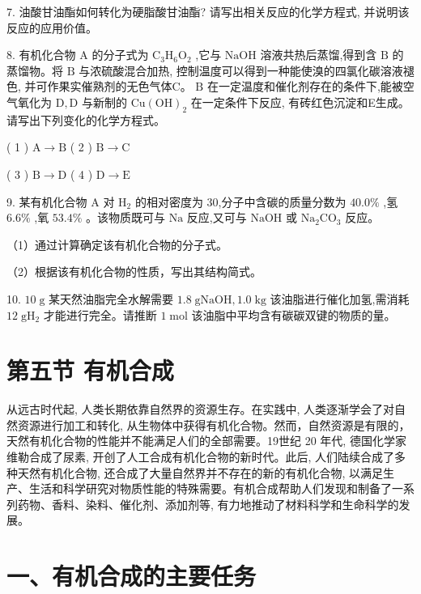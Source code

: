 \documentclass[10pt]{article}
\begin{document}
7. 油酸甘油酯如何转化为硬脂酸甘油酯? 请写出相关反应的化学方程式, 并说明该反应的应用价值。

8. 有机化合物 \(\mathrm{A}\) 的分子式为 \({\mathrm{C}}_{3}{\mathrm{H}}_{6}{\mathrm{O}}_{2}\) ,它与 \(\mathrm{{NaOH}}\) 溶液共热后蒸馏,得到含 \(\mathrm{B}\) 的蒸馏物。将 \(\mathrm{B}\) 与浓硫酸混合加热, 控制温度可以得到一种能使溴的四氯化碳溶液褪色, 并可作果实催熟剂的无色气体C。 \(\mathrm{B}\) 在一定温度和催化剂存在的条件下,能被空气氧化为 \(\mathrm{D},\mathrm{D}\) 与新制的 \(\mathrm{{Cu}}{\left( \mathrm{{OH}}\right) }_{2}\) 在一定条件下反应, 有砖红色沉淀和E生成。请写出下列变化的化学方程式。

( 1 ) \(\mathrm{A} \rightarrow \mathrm{B}\) ( 2 ) \(\mathrm{B} \rightarrow \mathrm{C}\)

( 3 ) \(\mathrm{B} \rightarrow \mathrm{D}\) ( 4 ) \(\mathrm{D} \rightarrow \mathrm{E}\)

9. 某有机化合物 \(\mathrm{A}\) 对 \({\mathrm{H}}_{2}\) 的相对密度为 30,分子中含碳的质量分数为 \({40.0}\%\) ,氢 \({6.6}\%\) ,氧 \({53.4}\%\) 。该物质既可与 \(\mathrm{{Na}}\) 反应,又可与 \(\mathrm{{NaOH}}\) 或 \({\mathrm{{Na}}}_{2}{\mathrm{{CO}}}_{3}\) 反应。

（1）通过计算确定该有机化合物的分子式。

（2）根据该有机化合物的性质，写出其结构简式。

10. \({10}\mathrm{\;g}\) 某天然油脂完全水解需要 \({1.8}\mathrm{\;g}\mathrm{{NaOH}},{1.0}\mathrm{\;{kg}}\) 该油脂进行催化加氢,需消耗 \({12}\mathrm{\;g}{\mathrm{H}}_{2}\) 才能进行完全。请推断 \(1\mathrm{\;{mol}}\) 该油脂中平均含有碳碳双键的物质的量。

\section*{第五节 有机合成}

从远古时代起, 人类长期依靠自然界的资源生存。在实践中, 人类逐渐学会了对自然资源进行加工和转化, 从生物体中获得有机化合物。然而，自然资源是有限的，天然有机化合物的性能并不能满足人们的全部需要。19世纪 20 年代, 德国化学家维勒合成了尿素, 开创了人工合成有机化合物的新时代。此后, 人们陆续合成了多种天然有机化合物, 还合成了大量自然界并不存在的新的有机化合物, 以满足生产、生活和科学研究对物质性能的特殊需要。有机合成帮助人们发现和制备了一系列药物、香料、染料、催化剂、添加剂等, 有力地推动了材料科学和生命科学的发展。

\section*{一、有机合成的主要任务}
\end{document}
